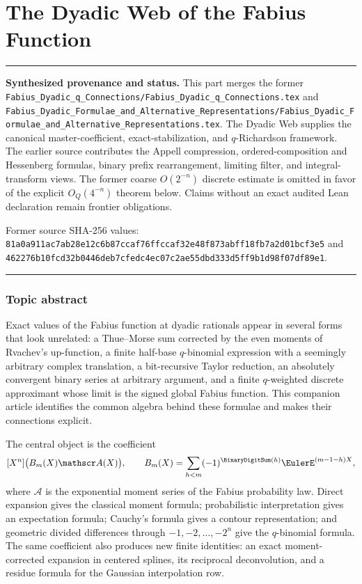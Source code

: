 \documentclass[11pt,oneside]{article}
\theoremstyle{definition}
\theoremstyle{remark}
\newenvironment{boxedremark}{%
  \par\smallskip\noindent\begin{center}\begin{minipage}{0.94\textwidth}%
  \color{black}\hrule\vspace{0.6em}\small
}{%
  \vspace{0.6em}\hrule\end{minipage}\end{center}\smallskip
}
\begin{document}
\part{The Dyadic Web of the Fabius Function}
\label{part:dyadicweb}
\begin{boxedremark}
\textbf{Synthesized provenance and status.} This part merges the former
\nolinkurl{Fabius_Dyadic_q_Connections/Fabius_Dyadic_q_Connections.tex} and
\nolinkurl{Fabius_Dyadic_Formulae_and_Alternative_Representations/Fabius_Dyadic_Formulae_and_Alternative_Representations.tex}.
The Dyadic Web supplies the canonical master-coefficient, exact-stabilization, and
$q$-Richardson framework.  The earlier source contributes the Appell compression,
ordered-composition and Hessenberg formulas, binary prefix rearrangement, limiting filter,
and integral-transform views.  The former coarse $O(2^{-n})$ discrete estimate is omitted
in favor of the explicit $O_Q(4^{-n})$ theorem below.  Claims without an exact audited Lean
declaration remain frontier obligations.\par\smallskip Former source SHA-256 values:
\nolinkurl{81a0a911ac7ab28e12c6b87ccaf76ffccaf32e48f873abff18fb7a2d01bcf3e5} and
\nolinkurl{462276b10fcd32b0446deb7cfedc4ec07c2ae55dbd333d5ff9b1d98f07df89e1}.
\end{boxedremark}
\section*{Topic abstract}
Exact values of the Fabius function at dyadic rationals appear in several forms that look
unrelated: a Thue--Morse sum corrected by the even moments of Rvachev's up-function, a finite
half-base $q$-binomial expression with a seemingly arbitrary complex translation, a
bit-recursive Taylor reduction, an absolutely convergent binary series at arbitrary argument,
and a finite $q$-weighted discrete approximant whose limit is the signed global Fabius
function.  This companion article identifies the common algebra behind these formulae and
makes their connections explicit.

The central object is the coefficient
\[
 [X^n]\bigl(B_m(X)\mathscr A(X)\bigr),
 \qquad
 B_m(X)=\sum_{h<m}(-1)^{\BinaryDigitSum(h)}\EulerE^{(m-1-h)X},
\]
where $\mathscr A$ is the exponential moment series of the Fabius probability law.  Direct
expansion gives the classical moment formula; probabilistic interpretation gives an
expectation formula; Cauchy's formula gives a contour representation; and geometric divided
differences through $-1,-2,\ldots,-2^n$ give the $q$-binomial formula.  The same coefficient
also produces new finite identities: an exact moment-corrected expansion in centered splines,
its reciprocal deconvolution, and a residue formula for the Gaussian interpolation row.
\end{document}
